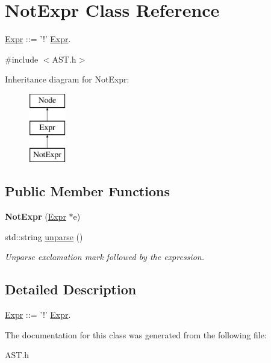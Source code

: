 \hypertarget{classNotExpr}{\section{Not\-Expr Class Reference}
\label{classNotExpr}
}


\hyperlink{classExpr}{Expr} \-:\-:= '!' \hyperlink{classExpr}{Expr}.  




{\ttfamily \#include $<$A\-S\-T.\-h$>$}

Inheritance diagram for Not\-Expr\-:\begin{figure}[H]
\begin{center}
\leavevmode
\includegraphics[height=3.000000cm]{classNotExpr}
\end{center}
\end{figure}
\subsection*{Public Member Functions}
\begin{DoxyCompactItemize}
\item 
\hypertarget{classNotExpr_a7939cb5c7141f8ede498cef1e8f9694c}{{\bfseries Not\-Expr} (\hyperlink{classExpr}{Expr} $\ast$e)}\label{classNotExpr_a7939cb5c7141f8ede498cef1e8f9694c}

\item 
\hypertarget{classNotExpr_ab49f96d8f23e3fa6bb21376dc0fa5215}{std\-::string \hyperlink{classNotExpr_ab49f96d8f23e3fa6bb21376dc0fa5215}{unparse} ()}\label{classNotExpr_ab49f96d8f23e3fa6bb21376dc0fa5215}

\begin{DoxyCompactList}\small\item\em Unparse exclamation mark followed by the expression. \end{DoxyCompactList}\end{DoxyCompactItemize}


\subsection{Detailed Description}
\hyperlink{classExpr}{Expr} \-:\-:= '!' \hyperlink{classExpr}{Expr}. 

The documentation for this class was generated from the following file\-:\begin{DoxyCompactItemize}
\item 
A\-S\-T.\-h\end{DoxyCompactItemize}
